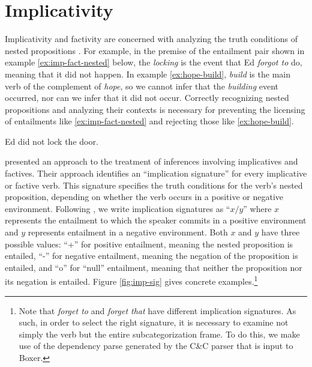 \section{Implicativity}
\label{sec:implicativity}

Implicativity and factivity are concerned with analyzing the truth conditions of
nested propositions \citep{nairn:icos2006}.  
For example, in the premise of the entailment pair shown in example 
\eqref{ex:imp-fact-nested} below, the {\it locking} is the event that Ed
{\it forgot to} do, meaning that it did not happen.  In example
\eqref{ex:hope-build}, {\it build} is the main verb of the complement of 
{\it hope}, so we cannot infer that the {\it building} event occurred, nor 
can we infer that it did not occur.  Correctly recognizing nested
propositions and analyzing their contexts is necessary for preventing
the licensing of entailments like \eqref{ex:imp-fact-nested} and rejecting those
like \eqref{ex:hope-build}.

{Ed did not lock the door.}



\citet{nairn:icos2006} presented an approach to the treatment of inferences
involving implicatives and factives.  Their approach identifies an ``implication
signature'' for every implicative or factive verb.  This signature specifies the
truth conditions for the verb's nested proposition, depending on whether the verb 
occurs in a positive or  negative environment.  Following 
\citet{maccartney:iwcs2009}, we write implication signatures as ``$x/y$'' where 
$x$ represents the entailment to which the speaker commits in a positive environment 
and $y$ represents entailment in a negative environment.  Both $x$ and $y$ have three
possible values: ``+'' for positive entailment, meaning the nested proposition
is entailed, ``-'' for negative entailment, meaning the negation of the
proposition is entailed, and ``o'' for ``null'' entailment, meaning that neither
the proposition nor its negation is entailed. Figure \ref{fig:imp-sig} gives
concrete examples.\footnote{Note that {\it forget to} and {\it forget that} have
different implication signatures.  As such, in order to select the right
signature, it is necessary to examine not simply the verb but the entire
subcategorization frame.  To do this, we make use of the dependency parse
generated by the C\&C parser that is input to Boxer.}


